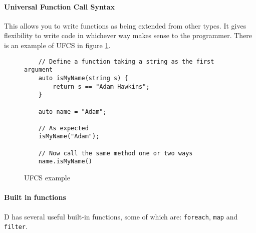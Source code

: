 \paragraph{Universal Function Call Syntax}

This allows you to write functions as being extended from other types. It gives flexibility to write code in whichever way makes sense to the programmer. There is an example of UFCS in figure \ref{fig:ufcs_code_example}.

\begin{figure}
  \caption{UFCS example}
  \label{fig:ufcs_code_example}
  \begin{lstlisting}
    // Define a function taking a string as the first argument
    auto isMyName(string s) {
        return s == "Adam Hawkins";
    }

    auto name = "Adam";

    // As expected
    isMyName("Adam");

    // Now call the same method one or two ways
    name.isMyName()
  \end{lstlisting}
\end{figure}

\paragraph{Built in functions}

D has several useful built-in functions, some of which are: \texttt{foreach}, \texttt{map} and \texttt{filter}.
